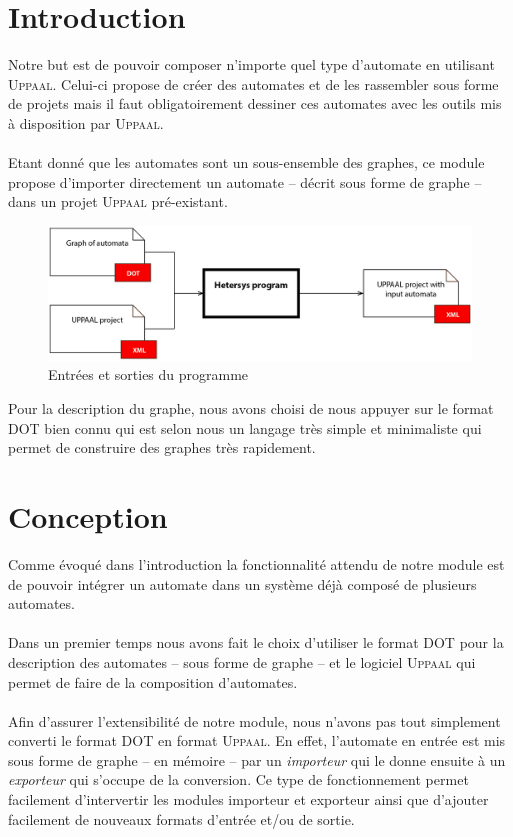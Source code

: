 \documentclass[12pt,a4paper]{report}
\begin{document}
\section{Introduction}

Notre but est de pouvoir composer n'importe quel type d'automate en utilisant 
\textsc{Uppaal}. Celui-ci propose de créer des automates et de les rassembler sous forme de projets 
mais il faut obligatoirement dessiner ces automates avec les outils mis à disposition
par \textsc{Uppaal}.
\\\\
Etant donné que les automates sont un sous-ensemble des graphes, ce module propose 
d'importer directement un automate -- décrit sous forme de graphe -- dans un projet 
\textsc{Uppaal} pré-existant. 

\begin{figure}[h]
  \centering
  \includegraphics[scale=0.3]{ressources/ProgramScheme.png}
  \caption{Entrées et sorties du programme}
\end{figure}

Pour la description du graphe, nous avons choisi de nous appuyer
sur le format DOT bien connu qui est selon nous un langage très simple et minimaliste 
qui permet de construire des graphes très rapidement.

\section{Conception}

Comme évoqué dans l'introduction la fonctionnalité attendu de notre module 
est de pouvoir intégrer un automate dans un système déjà composé de plusieurs
automates. 
\\\\
Dans un premier temps nous avons fait le choix d'utiliser le format DOT pour 
la description des automates -- sous forme de graphe -- et le logiciel \textsc{Uppaal}
qui permet de faire de la composition d'automates.
\\\\
Afin d'assurer l'extensibilité de notre module, nous n'avons pas tout simplement
converti le format DOT en format \textsc{Uppaal}. En effet, l'automate en entrée
est mis sous forme de graphe -- en mémoire -- par un \emph{importeur} qui 
le donne ensuite à un \emph{exporteur} qui s'occupe de la conversion.
Ce type de fonctionnement permet facilement d'intervertir les modules
importeur et exporteur ainsi que d'ajouter facilement de nouveaux formats d'entrée
et/ou de sortie.
\end{document}
